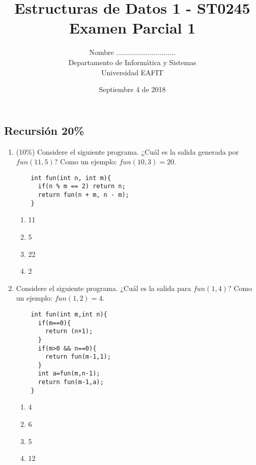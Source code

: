 \documentclass[10 pt]{article}
\title{\textbf {Estructuras de Datos 1 - ST0245\\Examen Parcial 1
}}
\author{Nombre ..............................\\
		Departamento de Informática y Sistemas\\
		Universidad EAFIT\\}
\date{Septiembre 4 de 2018}
\begin{document}
\lstset{escapechar=@,style=customc, numbers=left, stepnumber = 1} 
\maketitle
\begin{multicols}{2}
\section{Recursión 20\%}
\begin{enumerate}[label=(\alph*)]
	\item (10\%) Considere el siguiente programa. ¿Cuál es la salida generada por $fun(11, 5)$? Como un ejemplo: $fun(10, 3) = 20$.
	\begin{lstlisting}
	int fun(int n, int m){
	  if(n % m == 2) return n;
	  return fun(n + m, n - m);
	}
	\end{lstlisting}
	\begin{enumerate}[label=(\roman*)]
		\item 11
		\item 5
		\item 22
		\item 2
	\end{enumerate}
	\item Considere el siguiente programa. ¿Cuál es la salida para $fun(1, 4)$? Como un ejemplo: $fun(1,2)=4$.
	\begin{lstlisting}
	int fun(int m,int n){
	  if(m==0){
	    return (n+1);  
	  }
	  if(m>0 && n==0){
	    return fun(m-1,1);  
	  }
	  int a=fun(m,n-1);
	  return fun(m-1,a);
	}
	\end{lstlisting}	
	\begin{enumerate}[label=(\roman*)]
		\item 4
		\item 6
		\item 5
		\item 12
	\end{enumerate}
\end{enumerate}

\end{multicols}
\end{document}
